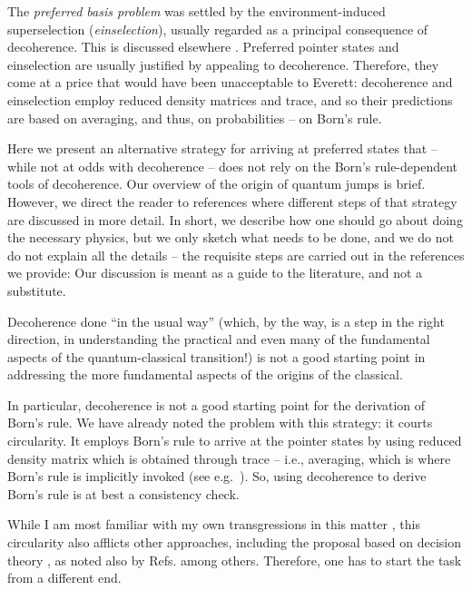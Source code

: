 \documentclass[aps,amsmath,amssymb,amsfonts,12pt]{revtex4-1}
\newcommand{\+}         {\dagger}
\begin{document}
The {\it preferred basis problem} was settled by the environment-induced superselection ({\it einselection}), 
usually regarded as a principal consequence of decoherence. This is discussed elsewhere \cite{69,70}.
Preferred pointer states and einselection are usually justified by appealing to decoherence. Therefore,
they come at a price that would have been unacceptable to Everett: decoherence and einselection
employ reduced density matrices and trace, and so their predictions are based on averaging, and thus, on probabilities -- on Born's rule.

Here we present an alternative strategy for arriving at preferred states that -- while not at odds with decoherence -- does not rely on the Born's rule-dependent tools of decoherence. Our overview of the origin of quantum jumps is brief. However, we direct the reader to references where different steps of that strategy are discussed in more detail. In short, we describe how one should go about doing the necessary physics, but we only sketch what needs to be done, and we do not do not explain all the details -- the requisite steps are carried out in the references we provide: Our discussion is meant as a guide to the literature, and not a substitute.

Decoherence done ``in the usual way'' (which, by the way, is a step in the right direction, in
understanding the practical and even many of the fundamental aspects of the quantum-classical
transition!) is not a good starting point in addressing the more fundamental aspects of the origins
of the classical. 

In particular, decoherence is not a good starting point for the derivation of Born's rule.
We have already noted the problem with this strategy: it courts circularity.
It employs Born's rule to arrive at the pointer states by using reduced density matrix which is obtained through trace -- i.e., averaging, which is where Born's rule is implicitly invoked (see e.g.~\cite{NC}). So, using decoherence to derive Born's rule is at best a consistency check. 

While I am most familiar with my own transgressions in this matter \cite{74}, this circularity also afflicts other approaches, including the proposal based on decision theory \cite{19,61,50}, as noted also by Refs. \cite{29,Synthese} among others. Therefore, one has to start the task from a different end. 
\end{document}
